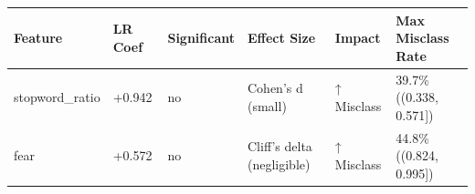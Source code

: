 \begin{tabular}{llllll}
\toprule
Feature & LR Coef & Significant & Effect Size & Impact & Max Misclass Rate \\
\midrule
stopword\_ratio & +0.942 & no & Cohen's d (small) & ↑ Misclass & 39.7\% ((0.338, 0.571]) \\
fear & +0.572 & no & Cliff's delta (negligible) & ↑ Misclass & 44.8\% ((0.824, 0.995]) \\
\bottomrule
\end{tabular}

